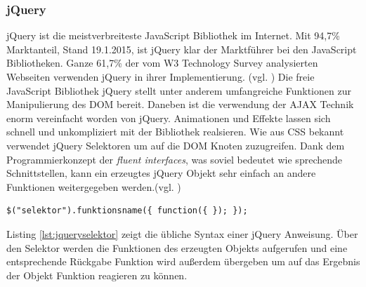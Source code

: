 \subsubsection{jQuery}
jQuery ist die meistverbreiteste JavaScript Bibliothek im Internet. Mit 94,7\% Marktanteil, Stand 19.1.2015, ist jQuery klar der Marktführer bei den JavaScript Bibliotheken. Ganze 61,7\% der vom W3 Technology Survey analysierten Webseiten verwenden jQuery in ihrer Implementierung. (vgl. \cite{w3tech}) Die freie JavaScript Bibliothek jQuery stellt unter anderem umfangreiche Funktionen zur Manipulierung des DOM bereit. Daneben ist die verwendung der AJAX Technik enorm vereinfacht worden von jQuery. Animationen und Effekte lassen sich schnell und unkompliziert mit der Bibliothek realsieren. Wie aus CSS bekannt verwendet jQuery Selektoren um auf die DOM Knoten zuzugreifen. Dank dem Programmierkonzept der \textit{fluent interfaces}, was soviel bedeutet wie sprechende Schnittstellen, kann ein erzeugtes jQuery Objekt sehr einfach an andere Funktionen weitergegeben werden.(vgl. \cite{wikijquery})


	\vspace{1em}
	\begin{lstlisting}[frame=htrbl, caption=jQuery Selektor Syntax, label=lst:jqueryselektor]
$("selektor").funktionsname({ function({ }); });
	\end{lstlisting}
	
Listing \ref{lst:jqueryselektor} zeigt die übliche Syntax einer jQuery Anweisung. Über den Selektor werden die Funktionen des erzeugten Objekts aufgerufen und eine entsprechende Rückgabe Funktion wird außerdem übergeben um auf das Ergebnis der Objekt Funktion reagieren zu können.

